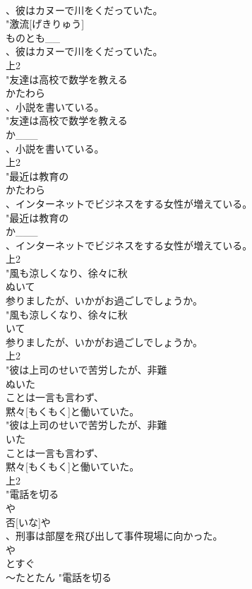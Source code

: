 \documentclass[8pt]{extreport}
\begin{document}
\begin{CJK}{UTF8}{min}
\\	、彼はカヌーで川をくだっていた。 
\\	"激流[げきりゅう]
\\	ものとも__
\\	、彼はカヌーで川をくだっていた。
\\	上2
\\	"友達は高校で数学を教える
\\	かたわら
\\	、小説を書いている。
\\	"友達は高校で数学を教える
\\	か___
\\	、小説を書いている。
\\	上2
\\	"最近は教育の
\\	かたわら
\\	、インターネットでビジネスをする女性が増えている。
\\	"最近は教育の
\\	か___
\\	、インターネットでビジネスをする女性が増えている。
\\	上2
\\	"風も涼しくなり、徐々に秋
\\	ぬいて
\\	参りましたが、いかがお過ごしでしょうか。
\\	"風も涼しくなり、徐々に秋
\\	いて
\\	参りましたが、いかがお過ごしでしょうか。
\\	上2
\\	"彼は上司のせいで苦労したが、非難
\\	ぬいた
\\	ことは一言も言わず、
\\	黙々[もくもく]と働いていた。
\\	"彼は上司のせいで苦労したが、非難
\\	いた
\\	ことは一言も言わず、
\\	黙々[もくもく]と働いていた。
\\	上2
\\	"電話を切る
\\	や
\\	否[いな]や
\\	、刑事は部屋を飛び出して事件現場に向かった。 
\\	や
\\	とすぐ 
\\	～たとたん	"電話を切る

\end{CJK}
\end{document}

